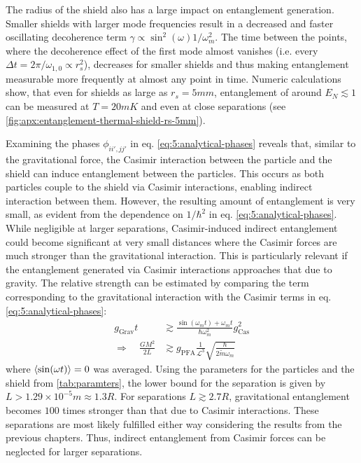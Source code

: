 The radius of the shield also has a large impact on entanglement generation. Smaller shields with larger mode frequencies result in a decreased and faster oscillating decoherence term $\gamma \propto \sin^2(\omega) 1/\omega_m^2$.
The time between the points, where the decoherence effect of the first mode almost vanishes (i.e. every $\Delta t = 2\pi/\omega_{1,0} \propto r_s^2$), decreases for smaller shields and thus making entanglement measurable more frequently at almost any point in time.
Numeric calculations show, that even for shields as large as $r_s = 5\si{mm}$, entanglement of around $E_N \lesssim 1$ can be measured at $T = 20\si{mK}$ and even at close separations (see \cref{fig:apx:entanglement-thermal-shield-rs-5mm}).

Examining the phases $\phi_{ii',jj'}$ in eq. \eqref{eq:5:analytical-phases} reveals that, similar to the gravitational force, the Casimir interaction between the particle and the shield can induce entanglement between the particles. This occurs as both particles couple to the shield via Casimir interactions, enabling indirect interaction between them.
However, the resulting amount of entanglement is very small, as evident from the dependence on $1/\hbar^2$ in eq. \eqref{eq:5:analytical-phases}.
While negligible at larger separations, Casimir-induced indirect entanglement could become significant at very small distances where the Casimir forces are much stronger than the gravitational interaction. 
This is particularly relevant if the entanglement generated via Casimir interactions approaches that due to gravity. 
The relative strength can be estimated by comparing the term corresponding to the gravitational interaction with the Casimir terms in eq. \eqref{eq:5:analytical-phases}:
\begin{align}
  g_\mathrm{Grav} t &\gtrsim \frac{\sin(\omega_m t) + \omega_m t}{\hbar \omega_m^2} g_\mathrm{Cas}^2 \\
  \Longrightarrow \quad 
  \frac{G M^2}{2L} &\gtrsim g_\mathrm{PFA} \frac{1}{\mathscr{L}^3} \sqrt{\frac{\hbar}{2\tilde{m}\omega_m}}
\end{align}
where $\left\langle\sin(\omega t)\right\rangle = 0$ was averaged.
Using the parameters for the particles and the shield from \cref{tab:paramters}, the lower bound for the separation is given by $L > 1.29\times 10^{-5}\si{m}\approx 1.3 R$. For separations $L \gtrsim 2.7R$, gravitational entanglement becomes $100$ times stronger than that due to Casimir interactions.
These separations are most likely fulfilled either way considering the results from the previous chapters.
Thus, indirect entanglement from Casimir forces can be neglected for larger separations.



